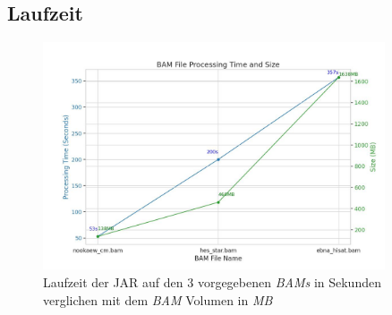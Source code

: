 \documentclass[12pt]{article}
\begin{document}
%


\subsection{Laufzeit}
\begin{figure}[htpb]
    \centering
    \includegraphics[width=0.9\textwidth]{./plots/times_bam.jpg}
    \caption{Laufzeit der JAR auf den 3 vorgegebenen \textit{BAMs} in Sekunden verglichen mit dem \textit{BAM} Volumen in \textit{MB} }
    \label{fig:-plots-times_bam-jpg}
\end{figure}
\end{document}
